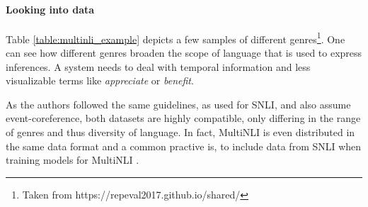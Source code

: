 \paragraph*{Looking into data}
Table \ref{table:multinli_example} depicts a few samples of different genres\footnote{Taken from https://repeval2017.github.io/shared/}. One can see how different genres broaden the scope of language that is used to express inferences. A system needs to deal with temporal information and less visualizable terms like \textit{appreciate} or \textit{benefit}.
\begin{center}
\begin{table}[h]
\begin{center}
\end{center}
\caption{Example sentence pairs from \ac{MultiNLI}, taken from RepEval 2017 Shared Task, showing samples of different genres.}
\label{table:multinli_example}
\end{table}
\end{center}
As the authors followed the same guidelines, as used for \ac{SNLI}, and also assume event-coreference, both datasets are highly compatible, only differing in the range of genres and thus diversity of language. In fact, \ac{MultiNLI} is even distributed in the same data format and a common practive is, to include data from \ac{SNLI} when training models for \ac{MultiNLI} \citep{nie2017shortcut,balazs2017refining,yang2017character}.

